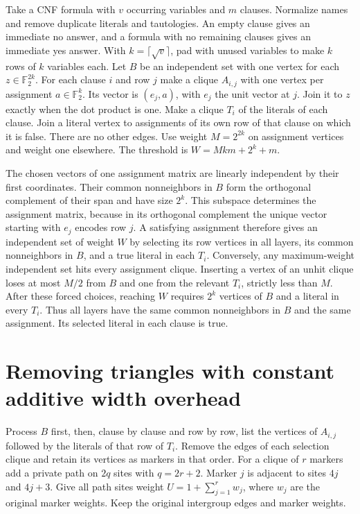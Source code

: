 \documentclass[11pt]{article}
\begin{document}
Take a CNF formula with \(v\) occurring variables and \(m\) clauses.
Normalize names and remove duplicate literals and tautologies.
An empty clause gives an immediate no answer, and a formula with no
remaining clauses gives an immediate yes answer. With
\(k=\lceil\sqrt{v}\rceil\), pad with unused variables to make \(k\) rows
of \(k\) variables each. Let \(B\) be an independent set with one
vertex for each \(z\in\mathbb F_2^{2k}\). For each clause \(i\) and
row \(j\) make a clique \(A_{i,j}\) with one vertex per assignment
\(a\in\mathbb F_2^k\). Its vector is \((e_j,a)\), with \(e_j\) the
unit vector at \(j\). Join it to \(z\) exactly when the dot product
is one. Make a clique \(T_i\) of the literals of each clause. Join a
literal vertex to assignments of its own row of that clause on
which it is false. There are no other edges. Use weight \(M=2^{2k}\)
on assignment vertices and weight one elsewhere. The threshold is
\(W=Mkm+2^k+m\).

The chosen vectors of one assignment matrix are linearly independent
by their first coordinates. Their common nonneighbors in \(B\) form
the orthogonal complement of their span and have size \(2^k\). This
subspace determines the assignment matrix, because in its orthogonal
complement the unique vector starting with \(e_j\) encodes row \(j\).
A satisfying assignment therefore gives an independent set of weight
\(W\) by selecting its row vertices in all layers, its common
nonneighbors in \(B\), and a true literal in each \(T_i\).
Conversely, any maximum-weight independent set hits every assignment
clique. Inserting a vertex of an unhit clique loses at most \(M/2\)
from \(B\) and one from the relevant \(T_i\), strictly less than \(M\).
After these forced choices, reaching \(W\) requires \(2^k\) vertices
of \(B\) and a literal in every \(T_i\). Thus all layers have the same
common nonneighbors in \(B\) and the same assignment. Its selected
literal in each clause is true.

\section{Removing triangles with constant additive width overhead}

Process \(B\) first, then, clause by clause and row by row, list
the vertices of \(A_{i,j}\) followed by the literals of that row of
\(T_i\). Remove the edges of each selection clique and retain its
vertices as markers in that order. For a clique of \(r\) markers
add a private path on \(2q\) sites with \(q=2r+2\). Marker \(j\)
is adjacent to sites \(4j\) and \(4j+3\). Give all path sites weight
\(U=1+\sum_{j=1}^{r}w_j\), where \(w_j\) are the original marker
weights. Keep the original intergroup edges and marker weights.
\end{document}
